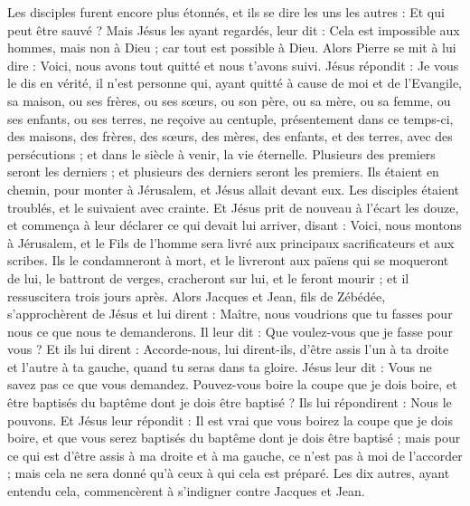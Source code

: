 \begin{multicols}{2}
Les disciples furent encore plus étonnés, et ils se dire les uns les autres : Et qui peut être sauvé ?
Mais Jésus les ayant regardés, leur dit : Cela est impossible aux hommes, mais non à Dieu ; car tout est possible à Dieu.
Alors Pierre se mit à lui dire : Voici, nous avons tout quitté et nous t'avons suivi.
Jésus répondit : Je vous le dis en vérité, il n’est personne qui, ayant quitté à cause de moi et de l’Evangile, sa maison, ou ses frères, ou ses sœurs, ou son père, ou sa mère, ou sa femme, ou ses enfants, ou ses terres,
ne reçoive au centuple, présentement dans ce temps-ci, des maisons, des frères, des sœurs, des mères, des enfants, et des terres, avec des persécutions ; et dans le siècle à venir, la vie éternelle.
Plusieurs des premiers seront les derniers ; et plusieurs des derniers seront les premiers.
Ils étaient en chemin, pour monter à Jérusalem, et Jésus allait devant eux. Les disciples étaient troublés, et le suivaient avec crainte. Et Jésus prit de nouveau à l'écart les douze, et commença à leur déclarer ce qui devait lui arriver,
disant : Voici, nous montons à Jérusalem, et le Fils de l'homme sera livré aux principaux sacrificateurs et aux scribes. Ils le condamneront à mort, et le livreront aux païens
qui se moqueront de lui, le battront de verges, cracheront sur lui, et le feront mourir ; et il ressuscitera trois jours après.
Alors Jacques et Jean, fils de Zébédée, s’approchèrent de Jésus et lui dirent : Maître, nous voudrions que tu fasses pour nous ce que nous te demanderons.
Il leur dit : Que voulez-vous que je fasse pour vous ?
Et ils lui dirent : Accorde-nous, lui dirent-ils, d’être assis l’un à ta droite et l’autre à ta gauche, quand tu seras dans ta gloire.
Jésus leur dit : Vous ne savez pas ce que vous demandez. Pouvez-vous boire la coupe que je dois boire, et être baptisés du baptême dont je dois être baptisé ?
Ils lui répondirent : Nous le pouvons. Et Jésus leur répondit : Il est vrai que vous boirez la coupe que je dois boire, et que vous serez baptisés du baptême dont je dois être baptisé ;
mais pour ce qui est d'être assis à ma droite et à ma gauche, ce n'est pas à moi de l’accorder ; mais cela ne sera donné qu’à ceux à qui cela est préparé.
Les dix autres, ayant entendu cela, commencèrent à s’indigner contre Jacques et Jean.

\end{multicols}
